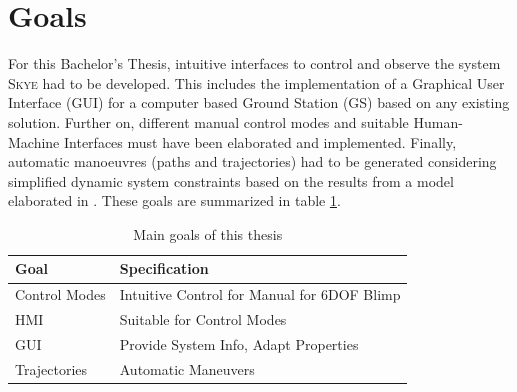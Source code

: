 \section{Goals}
\label{sec:goals}
For this Bachelor's Thesis, intuitive interfaces to control and observe the system \textsc{Skye} had to be developed. This includes the implementation of a Graphical User Interface (GUI) for a computer based Ground Station (GS) based on any existing solution. Further on, different manual control modes and suitable Human-Machine Interfaces must have been elaborated and implemented. Finally, automatic manoeuvres  (paths and trajectories) had to be generated considering simplified dynamic system constraints based on the results from a model elaborated in \cite{weichart}. These goals are summarized in table \ref{tab:goals}. \\

\begin{table}[H]
\begin{center}
 \begin{tabular}{ll}
 \hline
 Goal & Specification  \\ \hline \hline
 Control Modes 	& 	Intuitive Control for Manual for 6DOF Blimp \\
 HMI			&	Suitable for Control Modes \\
 GUI         	& 	Provide System Info, Adapt Properties \\
 Trajectories   & 	Automatic Maneuvers \\
 \hline
 \end{tabular}
 \caption{Main goals of this thesis}\vspace{1ex}
 \label{tab:goals}
\end{center}
\end{table}


